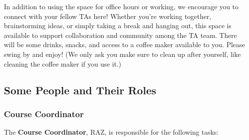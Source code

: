 \documentclass[
]{article}
\begin{document}
In addition to using the space for office hours or working, we encourage you to connect with your fellow TAs here! Whether you're working together, brainstorming ideas, or simply taking a break and hanging out, this space is available to support collaboration and community among the TA team. There will be some drinks, snacks, and access to a coffee maker available to you. Please swing by and enjoy! (We only ask you make sure to clean up after yourself, like cleaning the coffee maker if you use it.)

\hypertarget{some-people-and-their-roles}{%
\subsection{Some People and Their Roles}\label{some-people-and-their-roles}}

\hypertarget{course-coordinator}{%
\subsubsection{Course Coordinator}\label{course-coordinator}}

The \textbf{Course Coordinator}, RAZ, is responsible for the following tasks:
\end{document}
